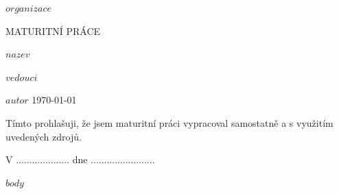\documentclass[12pt,a4paper,oneside]{article}
\begin{document}
\pagestyle{empty}
\begin{center}    
\Large $organizace$

\vspace*{\fill}

\Huge
MATURITNÍ PRÁCE

$nazev$
\vspace{2em}
\vspace*{\fill}

\end{center}      

{\Large
$vedouci$

$autor$
\hfill \today}

\clearpage

\vspace*{\fill}

Tímto prohlašuji, že jsem maturitní práci vypracoval samostatně a s využitím uvedených zdrojů.

V .................... dne ........................
    
\hspace{8.5cm} \makebox[2in]{\hrulefill}
                    
\hspace{8.5cm}     

\clearpage

\tableofcontents
\clearpage

\setcounter{page}{1}                                         
\pagestyle{plain}

$body$
\end{document}
